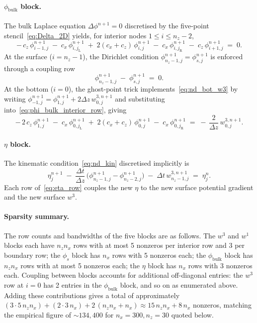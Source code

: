 \documentclass{article}
\begin{document}
\paragraph{$\phi_{\mathrm{bulk}}$ block.}
The bulk Laplace equation $\Delta\phi^{n+1} = 0$ discretised by the five-point stencil~\eqref{eq:Delta_2D} yields, for interior nodes $1 \le i \le n_z - 2$,
\begin{equation}
    -\,c_z\,\phi^{n+1}_{i-1, j} \;-\; c_x\,\phi^{n+1}_{i, j_{\mathrm{L}}} \;+\; 2(c_x + c_z)\,\phi^{n+1}_{i, j} \;-\; c_x\,\phi^{n+1}_{i, j_{\mathrm{R}}} \;-\; c_z\,\phi^{n+1}_{i+1, j} \;=\; 0. \label{eq:phi_bulk_interior_row}
\end{equation}
At the surface ($i = n_z - 1$), the Dirichlet condition $\phi^{n+1}_{n_z-1, j} = \phi^{n+1}_{s, j}$ is enforced through a coupling row
\begin{equation}
    \phi^{n+1}_{n_z-1, j} \;-\; \phi^{n+1}_{s, j} \;=\; 0. \label{eq:phi_bulk_surface_row}
\end{equation}
At the bottom ($i = 0$), the ghost-point trick implements~\eqref{eq:nd_bot_w3} by writing $\phi^{n+1}_{-1, j} = \phi^{n+1}_{1, j} + 2\Delta z\, w^{3,n+1}_{0, j}$ and substituting into~\eqref{eq:phi_bulk_interior_row}, giving
\begin{equation}
    -\,2\,c_z\,\phi^{n+1}_{1, j} \;-\; c_x\,\phi^{n+1}_{0, j_{\mathrm{L}}} \;+\; 2(c_x + c_z)\,\phi^{n+1}_{0, j} \;-\; c_x\,\phi^{n+1}_{0, j_{\mathrm{R}}} \;=\; -\,\frac{2}{\Delta z}\,w^{3,n+1}_{0, j}. \label{eq:phi_bulk_bottom_row}
\end{equation}

\paragraph{$\eta$ block.}
The kinematic condition~\eqref{eq:nd_kin} discretised implicitly is
\begin{equation}
    \eta_j^{n+1} \;-\; \frac{\Delta t}{\Delta z}\,\big(\phi^{n+1}_{n_z-1, j} - \phi^{n+1}_{n_z-2, j}\big) \;-\; \Delta t\, w^{3,n+1}_{n_z-1, j} \;=\; \eta_j^n. \label{eq:eta_row}
\end{equation}
Each row of~\eqref{eq:eta_row} couples the new $\eta$ to the new surface potential gradient and the new surface $w^3$.

\paragraph{Sparsity summary.}
The row counts and bandwidths of the five blocks are as follows.
The $w^3$ and $w^1$ blocks each have $n_z n_x$ rows with at most 5 nonzeros per interior row and 3 per boundary row; the $\phi_s$ block has $n_x$ rows with 5 nonzeros each; the $\phi_{\mathrm{bulk}}$ block has $n_z n_x$ rows with at most 5 nonzeros each; the $\eta$ block has $n_x$ rows with 3 nonzeros each.
Coupling between blocks accounts for additional off-diagonal entries: the $w^3$ row at $i = 0$ has 2 entries in the $\phi_{\mathrm{bulk}}$ block, and so on as enumerated above.
Adding these contributions gives a total of approximately $(3 \cdot 5\,n_z n_x) + (2 \cdot 3\,n_x) + 2\,(n_z n_x + n_x) \approx 15\,n_z n_x + 8\,n_x$ nonzeros, matching the empirical figure of $\sim 134{,}400$ for $n_x = 300, n_z = 30$ quoted below.
\color{black}
\end{document}

